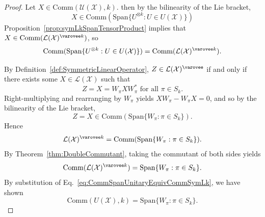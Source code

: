 \begin{proof}
Let $X \in \text{Comm}(\mathcal{U}(\mathcal{X}), k)$.
then by the bilinearity of the Lie bracket,
\begin{equation}
    X \in \text{Comm}(\text{Span}\{ U^{\otimes k} : U \in U(\mathcal{X}) \})
\end{equation}
Proposition~\ref{prop:symLkSpanTensorProduct} implies that $X \in \text{Comm}(\mathcal{L}(\mathcal{X})^{\varovee k})$, so
\begin{equation}\label{eq:CommSpanUnitaryEquivCommSymLk}
    \text{Comm}(\text{Span}\{ U^{\otimes k} : U \in U(\mathcal{X}) \}) = \text{Comm}(\mathcal{L}(\mathcal{X})^{\varovee k}).
\end{equation}

By Definition~\ref{def:SymmetricLinearOperator}, $Z \in \mathcal{L}(\mathcal{X})^{\varovee}$ if and only if there exists some $X \in \mathcal{L}(\mathcal{X})$ such that
\begin{equation}
    Z = X = W_{\pi} X W_{\pi}^* \text{ for all } \pi \in S_k.
\end{equation}
Right-multiplying and rearranging by $W_\pi$ yields $XW_{\pi} - W_{\pi} X = 0$, and so by the bilinearity of the Lie bracket,
\begin{equation}
    Z = X \in \text{Comm}(\text{Span}\{W_{\pi} : \pi \in S_k\}).
\end{equation}
Hence
\begin{equation}
    \mathcal{L}(\mathcal{X})^{\varovee k} = \text{Comm}(\text{Span}\{W_{\pi} : \pi \in S_k\}).
\end{equation}
By Theorem~\ref{thm:DoubleCommutant}, taking the commutant of both sides yields
\begin{equation}
    \text{Comm}(\mathcal{L}(\mathcal{X})^{\varovee k}) = \text{Span}\{W_{\pi} : \pi \in S_k\}.
\end{equation}
By substitution of Eq.~\ref{eq:CommSpanUnitaryEquivCommSymLk}, we have shown
\begin{equation}
    \text{Comm}(U(\mathcal{X}), k) = \text{Span}\{W_{\pi} : \pi \in S_{k} \}.
\end{equation}

\end{proof}
